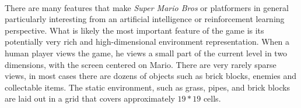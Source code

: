 \documentclass[12pt]{article}
\begin{document}
\begin{multicols}{2}
\\
\indent There are many features that make \textit {Super Mario Bros} or platformers in general particularly interesting from an artificial intelligence or reinforcement learning perspective. What is likely the most important feature of the game is its potentially very rich and high-dimensional environment representation. When a human player views the game, he views a small part of the current level in two dimensions, with the screen centered on Mario. There are very rarely sparse views, in most cases there are dozens of objects such as brick blocks, enemies and collectable items. The static environment, such as grass, pipes, and brick blocks are laid out in a grid that covers approximately $19 * 19$ cells.

\end{multicols}
\end{document}
